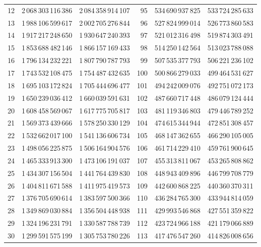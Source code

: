 \begin{longtable}{@{}r r r@{\qquad\qquad}r r r@{}}
12 & 2\,068\,303\,116\,386 & 2\,084\,358\,914\,107 & 95 & 534\,690\,937\,825 & 533\,724\,285\,633\\
13 & 1\,988\,106\,599\,617 & 2\,002\,705\,276\,844 & 96 & 527\,824\,999\,014 & 526\,773\,860\,583\\
14 & 1\,917\,217\,248\,650 & 1\,930\,647\,240\,393 & 97 & 521\,012\,316\,498 & 519\,874\,303\,491\\
15 & 1\,853\,688\,482\,146 & 1\,866\,157\,169\,433 & 98 & 514\,250\,142\,564 & 513\,023\,788\,088\\
16 & 1\,796\,134\,232\,221 & 1\,807\,790\,787\,793 & 99 & 507\,535\,377\,793 & 506\,221\,236\,102\\
17 & 1\,743\,532\,108\,475 & 1\,754\,487\,432\,635 & 100 & 500\,866\,279\,033 & 499\,464\,531\,627\\
18 & 1\,695\,103\,172\,824 & 1\,705\,444\,696\,477 & 101 & 494\,242\,009\,076 & 492\,751\,072\,173\\
19 & 1\,650\,239\,036\,412 & 1\,660\,039\,591\,631 & 102 & 487\,660\,717\,448 & 486\,079\,124\,444\\
20 & 1\,608\,458\,569\,067 & 1\,617\,775\,705\,817 & 103 & 481\,119\,346\,803 & 479\,446\,789\,252\\
21 & 1\,569\,373\,439\,666 & 1\,578\,250\,330\,129 & 104 & 474\,615\,344\,944 & 472\,851\,308\,457\\
22 & 1\,532\,662\,017\,100 & 1\,541\,136\,606\,734 & 105 & 468\,147\,362\,655 & 466\,290\,105\,005\\
23 & 1\,498\,056\,225\,875 & 1\,506\,164\,904\,576 & 106 & 461\,714\,229\,410 & 459\,761\,900\,645\\
24 & 1\,465\,333\,913\,300 & 1\,473\,106\,191\,037 & 107 & 455\,313\,811\,067 & 453\,265\,808\,862\\
25 & 1\,434\,307\,156\,504 & 1\,441\,764\,439\,830 & 108 & 448\,943\,409\,896 & 446\,799\,708\,779\\
26 & 1\,404\,811\,671\,588 & 1\,411\,975\,419\,573 & 109 & 442\,600\,868\,225 & 440\,360\,370\,311\\
27 & 1\,376\,705\,690\,614 & 1\,383\,597\,500\,366 & 110 & 436\,284\,765\,300 & 433\,944\,814\,059\\
28 & 1\,349\,869\,030\,884 & 1\,356\,504\,448\,938 & 111 & 429\,993\,546\,868 & 427\,551\,359\,822\\
29 & 1\,324\,196\,231\,791 & 1\,330\,587\,788\,739 & 112 & 423\,724\,966\,188 & 421\,179\,066\,889\\
30 & 1\,299\,591\,575\,199 & 1\,305\,753\,780\,226 & 113 & 417\,476\,547\,260 & 414\,826\,008\,656\\

\end{longtable}
